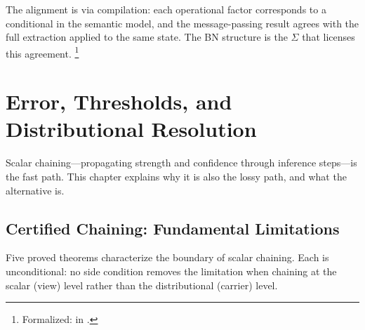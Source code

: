 \documentclass[11pt,openany]{report}
\begin{document}
\noindent
The alignment is via compilation: each operational factor corresponds
to a conditional in the semantic model, and the message-passing result
agrees with the full extraction applied to the same state.  The BN
structure is the $\Sigma$ that licenses this agreement.%
\footnote{Formalized:
 in
.}


\chapter{Error, Thresholds, and Distributional Resolution}
\label{ch:error-transport}

Scalar chaining---propagating strength and confidence through
inference steps---is the fast path.  This chapter explains why it
is also the lossy path, and what the alternative is.

\section{Certified Chaining: Fundamental Limitations}

Five proved theorems characterize the boundary of scalar chaining.
Each is unconditional: no side condition removes the limitation when
chaining at the scalar (view) level rather than the distributional
(carrier) level.
\end{document}

